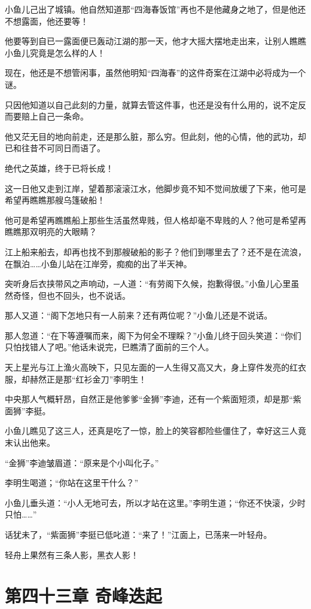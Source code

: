 \documentclass[12pt,oneside]{book}
\begin{document}
小鱼儿己出了城镇。他自然知道那``四海春饭馆''再也不是他藏身之地了，但是他还不想露面，他还要等！

他要等到自已一露面便已轰动江湖的那一天，他才大摇大摆地走出来，让别人瞧瞧小鱼儿究竟是怎么样的人！

现在，他还是不想管闲事，虽然他明知``四海春''的这件奇案在江湖中必将成为一个谜。

只因他知道以自己此刻的力量，就算去管这件事，也还是没有什么用的，说不定反而要赔上自己一条命。

他又茫无目的地向前走，还是那么脏，那么穷。但此刻，他的心情，他的武功，却已和往昔不可同日而语了。

绝代之英雄，终于已将长成！

这一日他又走到江岸，望着那滚滚江水，他脚步竟不知不觉间放缓了下来，他可是希望再瞧瞧那艘乌篷破船！

他可是希望再瞧瞧船上那些生活虽然卑贱，但人格却毫不卑贱的人？他可是希望再瞧瞧那双明亮的大眼睛？

江上船来船去，却再也找不到那艘破船的影子？他们到哪里去了？还不是在流浪，在飘泊\ldots\ldots 小鱼儿站在江岸旁，痴痴的出了半天神。

突听身后衣挟带风之声响动，─人道：``有劳阁下久候，抱歉得很。''小鱼儿心里虽然奇怪，但也不回头，也不说话。

那人又道：``阁下怎地只有一人前来？还有两位呢？''小鱼儿还是不说话。

那人忽道：``在下等遵嘱而来，阁下为何全不理睬？''小鱼儿终于回头笑道：``你们只怕找错人了吧。''他话未说完，巳瞧清了面前的三个人。

天上星光与江上渔火高映下，只见左面的一人生得又高又大，身上穿件发亮的红衣服，却赫然正是那``红衫金刀''李明生！

中央那人气概轩昂，自然正是他爹爹``金狮''李迪，还有一个紫面短须，却是那``紫面狮''李挺。

小鱼儿瞧见了这三人，还真是吃了一惊，脸上的笑容都险些僵住了，幸好这三人竟末认出他来。

``金狮''李迪皱眉道：``原来是个小叫化子。''

李明生喝道；``你站在这里干什么？''

小鱼儿垂头道：``小人无地可去，所以才站在这里。''李明生道；``你还不快滚，少时只怕\ldots\ldots{}''

话犹未了，``紫面狮''李挺已低叱道：``来了！''江面上，已荡来一叶轻舟。

轻舟上果然有三条人影，黑衣人影！

\hypertarget{ux7b2cux56dbux5341ux4e09ux7ae0-ux5947ux5cf0ux8fedux8d77}{%
\chapter{第四十三章
奇峰迭起}\label{ux7b2cux56dbux5341ux4e09ux7ae0-ux5947ux5cf0ux8fedux8d77}}
\end{document}
